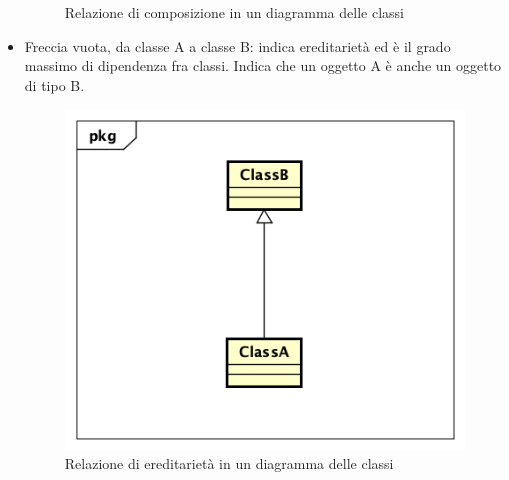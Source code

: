 \begin{itemize}
\begin{figure}[h]
		\caption{Relazione di composizione in un diagramma delle classi}\label{}
	\end{figure}
	\item Freccia vuota, da classe A a classe B: indica ereditarietà ed è il grado massimo di dipendenza fra classi. Indica che un oggetto A è anche un oggetto di tipo B.
	\begin{figure}[h]
		\centering
		\includegraphics[scale=0.5]{images/Ereditarieta.png}
		\caption{Relazione di ereditarietà in un diagramma delle classi}\label{}
	\end{figure}
\end{itemize}


